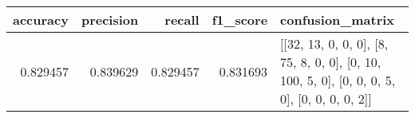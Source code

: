 \begin{tabular}{rrrrl}
\toprule
accuracy & precision & recall & f1_score & confusion_matrix \\
\midrule
0.829457 & 0.839629 & 0.829457 & 0.831693 & [[32, 13, 0, 0, 0], [8, 75, 8, 0, 0], [0, 10, 100, 5, 0], [0, 0, 0, 5, 0], [0, 0, 0, 0, 2]] \\
\bottomrule
\end{tabular}
